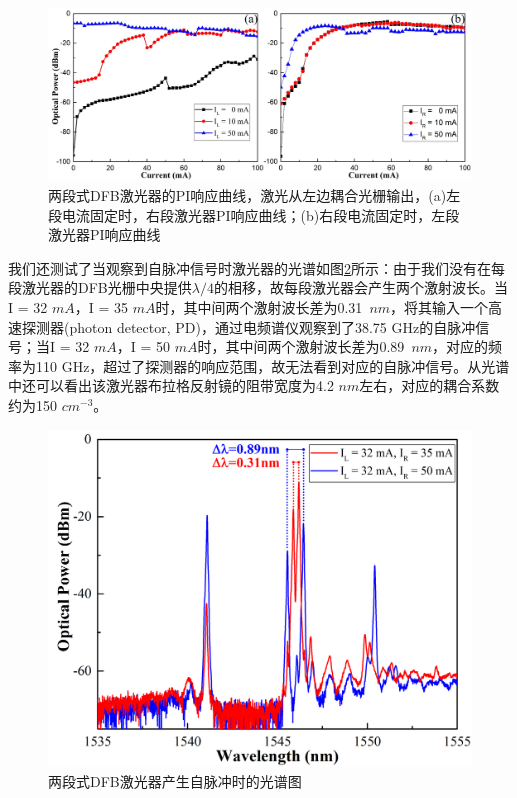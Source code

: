 \begin{figure}[htb]
	\centering
	\includegraphics[width=15cm]{./Pictures/laser_PI.jpg}
	\captionsetup{justification=centering}
	\caption{两段式DFB激光器的PI响应曲线，激光从左边耦合光栅输出，(a)左段电流固定时，右段激光器PI响应曲线；(b)右段电流固定时，左段激光器PI响应曲线}
	\label{laser_PI}
\end{figure}

我们还测试了当观察到自脉冲信号时激光器的光谱如图\ref{laser_spectrum}所示：由于我们没有在每段激光器的DFB光栅中央提供$\lambda/4$的相移，故每段激光器会产生两个激射波长。当I = 32 $mA$，I = 35 $mA$时，其中间两个激射波长差为0.31~$nm$，将其输入一个高速探测器(photon detector, PD)，通过电频谱仪观察到了38.75 GHz的自脉冲信号；当I = 32 $mA$，I = 50 $mA$时，其中间两个激射波长差为0.89~$nm$，对应的频率为110 GHz，超过了探测器的响应范围，故无法看到对应的自脉冲信号。从光谱中还可以看出该激光器布拉格反射镜的阻带宽度为4.2 $nm$左右，对应的耦合系数约为150 $cm^{-3}$。

\begin{figure}[htb]
	\centering
	\includegraphics[width=12cm]{./Pictures/laser_spectrum.jpg}
	\captionsetup{justification=centering}
	\caption{两段式DFB激光器产生自脉冲时的光谱图}
	\label{laser_spectrum}
\end{figure}

